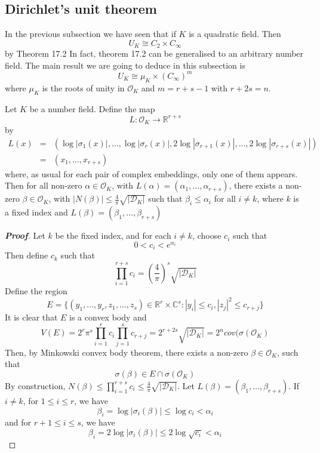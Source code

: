 \subsection{Dirichlet's unit theorem}
In the previous subsection we have seen that if $K$ is a quadratic field. Then
$$U_K \cong C_2 \times C_\infty$$
by Theorem 17.2 In fact, theorem 17.2 can be generalised to an arbitrary number field. The main result we are
going to deduce in this subsection is
$$U_K \cong \mu_K \times (C_\infty)^m$$
where $\mu_K$ is the roots of unity in $\mathcal{O}_K$ and $m=r+s-1$ with $r+2s=n$.
\begin{lemma} Let $K$ be a number field. Define the map
$$L:\mathcal{O}_K \rightarrow \mathbb{R}^{r+s}$$
by
\begin{eqnarray*}
L(x)&=&(\log{|\sigma_1(x)|},\ldots,\log{|\sigma_r(x)|},2\log{|\sigma_{r+1}(x)|},\ldots,2\log{|\sigma_{r+s}(x)|})\\
&=&(x_1,\ldots,x_{r+s})
\end{eqnarray*}
where, as usual for each pair of complex embeddings, only one of them appears.
Then for all non-zero $\alpha \in \mathcal{O}_K$, with $L(\alpha)=(\alpha_1,\ldots,\alpha_{r+s})$,
there exists a non-zero $\beta \in \mathcal{O}_K$, with $|N(\beta)| \le \frac{4}{\pi}\sqrt{|\mathcal{D}_K|}$
such that $\beta_i \le \alpha_i$ for all $i \neq k$, where $k$ is a fixed index and $L(\beta)=(\beta_1,\ldots,\beta_{r+s})$
\end{lemma}
\begin{proof}[\bf Proof] Let $k$ be the fixed index, and for each $i \neq k$, choose $c_i$ such that
$$0 <c_i<e^{\alpha_i}$$
Then define $c_k$ such that
$$\prod_{i=1}^{r+s} c_i=\left(\frac{4}{\pi}\right)^s \sqrt{|\mathcal{D}_K|}$$
Define the region
$$E=\{(y_1,\ldots,y_r,z_1,\ldots,z_s) \in \mathbb{R}^r \times \mathbb{C}^s: |y_i| \le c_i, |z_j|^2 \le c_{r+j}\}$$
It is clear that $E$ is a convex body and
$$V(E)=2^r \pi^s \prod_{i=1}^r c_i \prod_{j=1}^s c_{r+j}=2^{r+2s}\sqrt{|\mathcal{D}_K|}=2^n cov(\sigma(\mathcal{O}_K)$$
Then, by Minkowski convex body theorem, there exists a non-zero $\beta \in \mathcal{O}_K$, such that
$$\sigma(\beta) \in E \cap \sigma(\mathcal{O}_K)$$
By construction, $N(\beta) \le \prod_{i=1}^{r+s}c_i \le \frac{4}{\pi}\sqrt{|\mathcal{D}_K|}$.
Let $L(\beta)=(\beta_1,\ldots,\beta_{r+s})$. If $i \neq k$, for $1 \le i \le r$, we have
$$\beta_i=\log{|\sigma_i(\beta)|} \le \log{c_i} <\alpha_i$$
and for $r+1\le i \le s$, we have
$$\beta_i=2\log{|\sigma_i(\beta)|} \le 2\log{\sqrt{c_i}} <\alpha_i$$
\end{proof}
